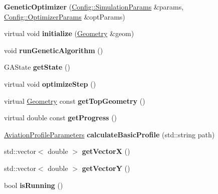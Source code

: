 \begin{DoxyCompactItemize}
\item 
\mbox{\label{class_genetic_optimizer_a64d3d782d76c1baad7e3abd37cf376ad}} 
{\bfseries Genetic\+Optimizer} (\hyperlink{struct_config_1_1_simulation_params}{Config\+::\+Simulation\+Params} \&params, \hyperlink{struct_config_1_1_optimizer_params}{Config\+::\+Optimizer\+Params} \&opt\+Params)
\item 
\mbox{\label{class_genetic_optimizer_a56ed2a002152fa57bec6596c1fbf220f}} 
virtual void {\bfseries initialize} (\hyperlink{class_geometry}{Geometry} \&geom)
\item 
\mbox{\label{class_genetic_optimizer_ac3350b35f1b7072ec75aef879d74d125}} 
void {\bfseries run\+Genetic\+Algorithm} ()
\item 
\mbox{\label{class_genetic_optimizer_a33817c3a5cf8f9590a0054636af4510b}} 
G\+A\+State {\bfseries get\+State} ()
\item 
\mbox{\label{class_genetic_optimizer_adb9c71703b5e2cb13bcb8c3c4b49b743}} 
virtual void {\bfseries optimize\+Step} ()
\item 
\mbox{\label{class_genetic_optimizer_afbce0360126b8cb9f3e242d3bbc02422}} 
virtual \hyperlink{class_geometry}{Geometry} const {\bfseries get\+Top\+Geometry} ()
\item 
\mbox{\label{class_genetic_optimizer_a8d9aea6ca935024e3c5ecbc10b10c2a2}} 
virtual double const {\bfseries get\+Progress} ()
\item 
\mbox{\label{class_genetic_optimizer_a1db42893114197a9959fa5f7ac0176ae}} 
\hyperlink{struct_aviation_profile_parameters}{Aviation\+Profile\+Parameters} {\bfseries calculate\+Basic\+Profile} (std\+::string path)
\item 
\mbox{\label{class_genetic_optimizer_a255076a279ba7c6665b6d06fb871f620}} 
std\+::vector$<$ double $>$ {\bfseries get\+VectorX} ()
\item 
\mbox{\label{class_genetic_optimizer_a679345a9ca88eb5122f4192c4239c276}} 
std\+::vector$<$ double $>$ {\bfseries get\+VectorY} ()
\item 
\mbox{\label{class_genetic_optimizer_a096ebb1c1b1c0630516373b236c71985}} 
bool {\bfseries is\+Running} ()
\end{DoxyCompactItemize}


